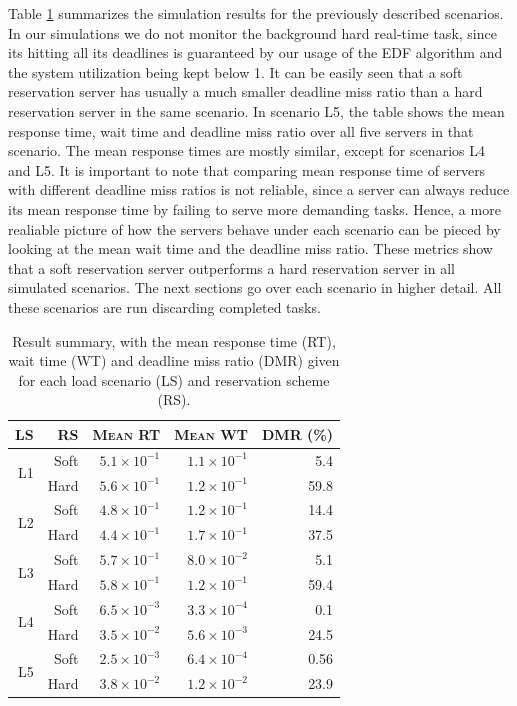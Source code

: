 \documentclass[12pt]{article}
\begin{document}
Table \ref{tab:summary} summarizes the simulation results for the
previously described scenarios. In our simulations we do not monitor
the background hard real-time task, since its hitting all its
deadlines is guaranteed by our usage of the EDF algorithm and the
system utilization being kept below 1. It can be easily seen that a
soft reservation server has usually a much smaller deadline miss ratio
than a hard reservation server in the same scenario. In scenario L5,
the table shows the mean response time, wait time and deadline miss
ratio over all five servers in that scenario. The mean response times
are mostly similar, except for scenarios L4 and L5. It is important to
note that comparing mean response time of servers with different
deadline miss ratios is not reliable, since a server can always reduce
its mean response time by failing to serve more demanding
tasks. Hence, a more realiable picture of how the servers behave under
each scenario can be pieced by looking at the mean wait time and the
deadline miss ratio. These metrics show that a soft reservation server
outperforms a hard reservation server in all simulated scenarios. The
next sections go over each scenario in higher detail. All these
scenarios are run discarding completed tasks.

\begin{table}[ht]
  \centering
  \begin{tabular}[t]{rrrrr} \hline
    \textsc{LS} & \textsc{RS} & \textsc{Mean RT} & \textsc{Mean WT} & \textsc{DMR (\%)} \\ \hline
    \multirow{2}{*}{L1} & Soft & $5.1\times 10^{-1}$   & $1.1\times 10^{-1}$   & 5.4  \\
                        & Hard & $5.6\times 10^{-1}$   & $1.2\times 10^{-1}$   & 59.8 \\ \hline
    \multirow{2}{*}{L2} & Soft & $4.8\times 10^{-1}$   & $1.2\times 10^{-1}$   & 14.4 \\
                        & Hard & $4.4\times 10^{-1}$   & $1.7\times 10^{-1}$   & 37.5 \\ \hline
    \multirow{2}{*}{L3} & Soft & $5.7\times 10^{-1}$   & $8.0\times 10^{-2}$   & 5.1  \\
                        & Hard & $5.8\times 10^{-1}$   & $1.2\times 10^{-1}$   & 59.4 \\ \hline
    \multirow{2}{*}{L4} & Soft & $6.5\times 10^{-3}$   & $3.3\times 10^{-4}$   & 0.1  \\
                        & Hard & $3.5\times 10^{-2}$   & $5.6\times 10^{-3}$   & 24.5 \\ \hline    
    \multirow{2}{*}{L5} & Soft & $2.5\times 10^{-3}$   & $6.4\times 10^{-4}$   & 0.56  \\
                        & Hard & $3.8\times 10^{-2}$   & $1.2\times 10^{-2}$   & 23.9 \\ \hline    
  \end{tabular}
  \caption{Result summary, with the mean response time (RT), wait time
  (WT) and deadline miss ratio (DMR) given for each load scenario (LS)
  and reservation scheme (RS).}
  \label{tab:summary}
\end{table}
\end{document}
